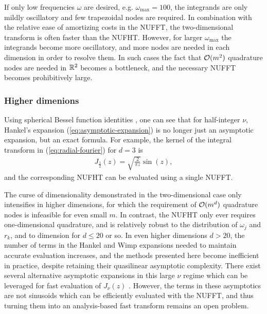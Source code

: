 If only low frequencies $\omega$ are desired, e.g. $\omega_{\text{max}} = 100$,
the integrands are only mildly oscillatory and few trapezoidal nodes are
required. In combination with the relative ease of amortizing costs in the
NUFFT, the two-dimensional transform is often faster than the NUFHT. However,
for larger $\omega_{\text{max}}$ the integrands become more oscillatory, and
more nodes are needed in each dimension in order to resolve them. In such cases
the fact that $\mathcal{O}(m^2)$ quadrature nodes are needed in $\mathbb{R}^2$ becomes a
bottleneck, and the necessary NUFFT becomes prohibitively large. 


\subsubsection{Higher dimenions}

Using spherical Bessel function identities \cite[10.47.3,
10.49.2]{olver2010nist}, one can see that for half-integer $\nu$, Hankel's
expansion (\ref{eq:asymptotic-expansion}) is no longer just an asymptotic
expansion, but an exact formula.
For example, the kernel of the integral transform in (\ref{eq:radial-fourier})
for $d = 3$ is
\begin{align}
  J_{\frac{1}{2}}(z) = \sqrt{\frac{2}{\pi z}} \sin(z),
\end{align}
and the corresponding NUFHT can be evaluated using a single NUFFT.

The curse of dimensionality demonstrated in the two-dimensional case only
intensifies in higher dimensions, for which the requirement of $\mathcal{O}(m^d)$
quadrature nodes is infeasible for even small $m$. In contrast, the NUFHT only
ever requires one-dimensional quadrature, and is relatively robust to the
distribution of $\omega_j$ and $r_k$, and to dimension for $d \leq 20$ or so. In
even higher dimensions $d > 20$, the number of terms in the Hankel and Wimp
expansions needed to maintain accurate evaluation increases, and the methods
presented here become inefficient in practice, despite retaining their
quasilinear asymptotic complexity. There exist several alternative asymptotic
expansions in this large $\nu$ regime which can be leveraged for fast evaluation
of $J_\nu(z)$ \citep[10.19]{heitman2015asymptotics, olver2010nist}. However, the
terms in these asymptotics are not sinusoids which can be efficiently evaluated
with the NUFFT, and thus turning them into an analysis-based fast transform
remains an open problem.
